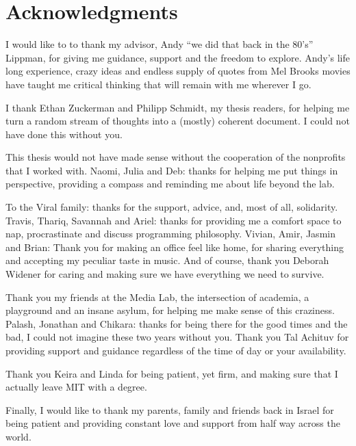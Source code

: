 
\chapter*{Acknowledgments}

\bigskip

I would like to to thank my advisor, Andy ``we did that back in the 80's'' Lippman, for giving me guidance, support and the freedom to explore. Andy's life long experience, crazy ideas and endless supply of quotes from Mel Brooks movies have taught me critical thinking that will remain with me wherever I go.

I thank Ethan Zuckerman and Philipp Schmidt, my thesis readers, for helping me turn a random stream of thoughts into a (mostly) coherent document. I could not have done this without you.

This thesis would not have made sense without the cooperation of the nonprofits that I worked with. Naomi, Julia and Deb: thanks for helping me put things in perspective, providing a compass and reminding me about life beyond the lab.

To the Viral family: thanks for the support, advice, and, most of all, solidarity. Travis, Thariq, Savannah and Ariel: thanks for providing me a comfort space to nap, procrastinate and discuss programming philosophy. Vivian, Amir, Jasmin and Brian: Thank you for making an office feel like home, for sharing everything and accepting my peculiar taste in music. And of course, thank you Deborah Widener for caring and making sure we have everything we need to survive.

Thank you my friends at the Media Lab, the intersection of academia, a playground and an insane asylum, for helping me make sense of this craziness. Palash, Jonathan and Chikara: thanks for being there for the good times and the bad, I could not imagine these two years without you. Thank you Tal Achituv for providing support and guidance regardless of the time of day or your availability. 

Thank you Keira and Linda for being patient, yet firm, and making sure that I actually leave MIT with a degree. 

Finally, I would like to thank my parents, family and friends back in Israel for being patient and providing constant love and support from half way across the world. 